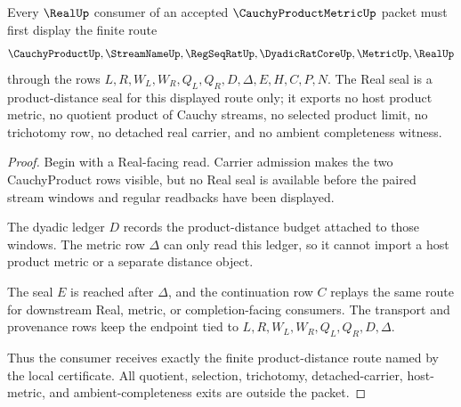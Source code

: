 \begin{theorem}
\label{thm:cauchy-product-metric-real-seal-boundary}
Every $\RealUp$ consumer of an accepted $\CauchyProductMetricUp$ packet must first display the finite route
$$
\CauchyProductUp,\StreamNameUp,\RegSeqRatUp,\DyadicRatCoreUp,\MetricUp,\RealUp
$$
through the rows $L,R,W_L,W_R,Q_L,Q_R,D,\Delta,E,H,C,P,N$. The Real seal is a product-distance seal for this displayed route only; it exports no host product metric, no quotient product of Cauchy streams, no selected product limit, no trichotomy row, no detached real carrier, and no ambient completeness witness.
\end{theorem}
\begin{proof}
Begin with a Real-facing read. Carrier admission makes the two CauchyProduct rows visible, but no Real seal is available before the paired stream windows and regular readbacks have been displayed.

The dyadic ledger $D$ records the product-distance budget attached to those windows. The metric row $\Delta$ can only read this ledger, so it cannot import a host product metric or a separate distance object.

The seal $E$ is reached after $\Delta$, and the continuation row $C$ replays the same route for downstream Real, metric, or completion-facing consumers. The transport and provenance rows keep the endpoint tied to $L,R,W_L,W_R,Q_L,Q_R,D,\Delta$.

Thus the consumer receives exactly the finite product-distance route named by the local certificate. All quotient, selection, trichotomy, detached-carrier, host-metric, and ambient-completeness exits are outside the packet.
\end{proof}


\begin{closurestatus}{\CauchyProductMetricUp}
  \theoryclosure{\seedClosure}
  \formalstatus{\unformalizedV}
\end{closurestatus}
